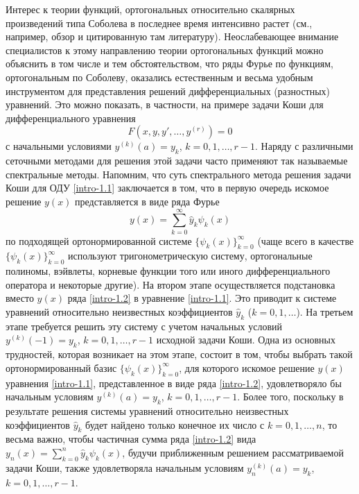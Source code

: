 \Introduction
Интерес к теории функций, ортогональных относительно скалярных произведений типа Соболева в последнее время интенсивно растет  (см., например, обзор \cite{sms-stn-1-MarcelXu} и цитированную там литературу). Неослабевающее внимание специалистов  к этому направлению теории ортогональных функций можно объяснить в том числе и тем обстоятельством, что ряды Фурье по функциям, ортогональным по Соболеву, оказались естественным и весьма удобным инструментом для представления решений  дифференциальных (разностных) уравнений. Это можно показать, в частности, на примере  задачи Коши для дифференциального уравнения
\begin{equation}\label{intro-1.1}
F(x,y,y',\ldots,y^{(r)})=0
 \end{equation}
с начальными условиями $y^{(k)}(a)=y_k$, $k=0,1,\ldots,r-1$.  Наряду с различными сеточными методами для решения этой задачи часто применяют так называемые спектральные методы. Напомним, что суть спектрального метода решения задачи Коши  для ОДУ \eqref{intro-1.1} заключается в том, что в первую очередь искомое решение $y(x)$ представляется в виде ряда Фурье
\begin{equation}\label{intro-1.2}
 y(x)=\sum_{k=0}^\infty \hat y_k\psi_k(x)
 \end{equation}
по подходящей ортонормированной системе $\{\psi_k(x)\}_{k=0}^\infty$ (чаще всего в качестве $\{\psi_k(x)\}_{k=0}^\infty$ используют    тригонометрическую систему, ортогональные полиномы, вэйвлеты, корневые функции того или иного дифференциального оператора  и некоторые другие). На втором этапе осуществляется подстановка вместо $y(x)$ ряда \eqref{intro-1.2} в уравнение \eqref{intro-1.1}. Это приводит к системе уравнений относительно неизвестных коэффициентов $\hat y_k$ ($k=0,1,\ldots$). На третьем этапе требуется решить эту систему с учетом начальных условий  $y^{(k)}(-1)=y_k$, $k=0,1,\ldots,r-1$ исходной задачи Коши.
Одна из основных трудностей, которая возникает на этом этапе, состоит в том, чтобы
выбрать такой ортонормированный базис $\{\psi_k(x)\}_{k=0}^\infty$, для которого искомое решение $y(x)$ уравнения \eqref{intro-1.1}, представленное в виде ряда  \eqref{intro-1.2}, удовлетворяло бы начальным условиям $y^{(k)}(a)=y_k$, $k=0,1,\ldots,r-1$. Более того, поскольку в результате решения системы уравнений относительно неизвестных коэффициентов $\hat y_k$  будет найдено только конечное их число с $k=0,1,\ldots, n$, то весьма важно, чтобы частичная сумма ряда \eqref{intro-1.2} вида $ y_n(x)=\sum_{k=0}^n\hat y_k\psi_k(x)$,
 будучи приближенным решением рассматриваемой задачи Коши, также удовлетворяла начальным условиям $y_n^{(k)}(a)=y_k$, $k=0,1,\ldots,r-1$.

